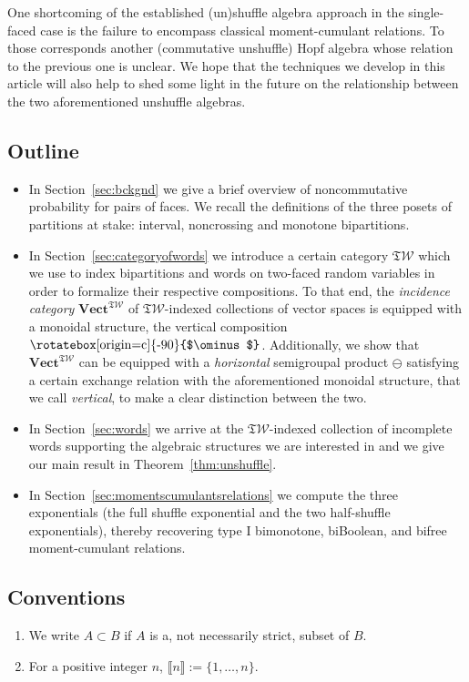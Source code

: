 \documentclass[pdftex]{sigma}
\newcommand\overt{\mathbin{\text{\rotatebox[origin=c]{-90}{$\ominus$}}}}
\newcommand{\SWc}{{\mathfrak{T}\mathcal{W}}}
\newcommand\CAT[1]{\mathbf{#1}}
\newcommand{\Vect}{\CAT{Vect}}
\numberwithin{equation}{section}
\begin{document}
One shortcoming of the established (un)shuffle algebra approach in the single-faced case is the failure to encompass classical moment-cumulant relations. To those corresponds another (commutative unshuffle) Hopf algebra whose relation to the previous one is unclear. We hope that the techniques we develop in this article will also help to shed some light in the future on the relationship between the two aforementioned unshuffle algebras.

\subsection{Outline}

\begin{itemize}\itemsep=0pt
\item In Section~\ref{sec:bckgnd} we give a brief overview of noncommutative probability for pairs of faces. We recall the definitions of the three posets of partitions at stake: interval, noncrossing and monotone bipartitions.
\item In Section~\ref{sec:categoryofwords} we introduce a certain category $\SWc$ which we use to index bipartitions and words on two-faced random variables in order to formalize their respective compositions. To that end, the \emph{incidence category} $\Vect^\SWc$ of $\SWc$-indexed collections of vector spaces is equipped with a monoidal structure, the vertical composition $\overt$.
 Additionally, we show that $\Vect^\SWc$ can be equipped with a \emph{horizontal} semigroupal product $\ominus$ satisfying a certain exchange relation with the aforementioned monoidal structure, that we call \emph{vertical}, to make a clear distinction between the two.
\item In Section~\ref{sec:words} we arrive at the $\SWc$-indexed collection of incomplete words supporting the algebraic structures we are interested in and we give our main result in Theorem~\ref{thm:unshuffle}.
\item In Section~\ref{sec:momentscumulantsrelations} we compute the three exponentials (the full shuffle exponential and the two half-shuffle exponentials), thereby recovering type I bimonotone, biBoolean, and bifree moment-cumulant relations.
\end{itemize}

\subsection{Conventions}
\begin{enumerate}\itemsep=0pt
\item We write $A\subset B$ if $A$ is a, not necessarily strict, subset of $B$.
\item For a positive integer $n$, $\llbracket n \rrbracket := \{1, \dots, n\}$.
\end{enumerate}
\end{document}
